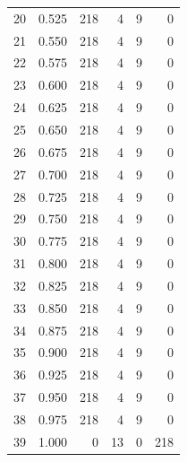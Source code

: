 \documentclass[a4paper,twoside,12pt]{book}
\begin{document}
\begin{appendices}
\begin{table}
\begin{tabular}{lrrrrr}
		20 &  0.525 &       218 &         4 &               9 &               0 \\
		21 &  0.550 &       218 &         4 &               9 &               0 \\
		22 &  0.575 &       218 &         4 &               9 &               0 \\
		23 &  0.600 &       218 &         4 &               9 &               0 \\
		24 &  0.625 &       218 &         4 &               9 &               0 \\
		25 &  0.650 &       218 &         4 &               9 &               0 \\
		26 &  0.675 &       218 &         4 &               9 &               0 \\
		27 &  0.700 &       218 &         4 &               9 &               0 \\
		28 &  0.725 &       218 &         4 &               9 &               0 \\
		29 &  0.750 &       218 &         4 &               9 &               0 \\
		30 &  0.775 &       218 &         4 &               9 &               0 \\
		31 &  0.800 &       218 &         4 &               9 &               0 \\
		32 &  0.825 &       218 &         4 &               9 &               0 \\
		33 &  0.850 &       218 &         4 &               9 &               0 \\
		34 &  0.875 &       218 &         4 &               9 &               0 \\
		35 &  0.900 &       218 &         4 &               9 &               0 \\
		36 &  0.925 &       218 &         4 &               9 &               0 \\
		37 &  0.950 &       218 &         4 &               9 &               0 \\
		38 &  0.975 &       218 &         4 &               9 &               0 \\
		39 &  1.000 &         0 &        13 &               0 &             218 \\
		\bottomrule
	\end{tabular}		
\end{table}



\end{appendices}
\end{document}
